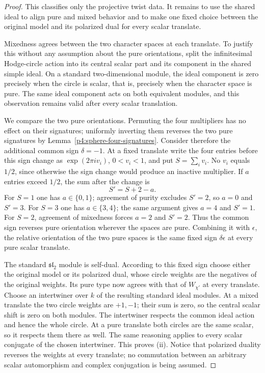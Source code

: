 \documentclass[11pt]{article}
\theoremstyle{plain}
\theoremstyle{definition}
\theoremstyle{remark}
\numberwithin{equation}{section}
\begin{document}
\begin{proof}
This classifies only the projective twist data.  It remains to use the
shared ideal to align pure and mixed behavior and to make one fixed choice
between the original model and its polarized dual for every scalar translate.

Mixedness agrees between the two character spaces at each
translate.  To justify this without any assumption about the
pure orientations, split the infinitesimal Hodge-circle action
into its central scalar part and its component in the shared
simple ideal.  On a standard two-dimensional module, the
ideal component is zero precisely when the circle is scalar,
that is, precisely when the character space is pure.  The
same ideal component acts on both equivalent modules, and
this observation remains valid after every scalar translation.

We compare the two pure orientations.  Permuting the four
multipliers has no effect on their signatures; uniformly
inverting them reverses the two pure signatures by
Lemma~\ref{p4:sphere-four-signatures}.  Consider therefore
the additional common sign $\delta=-1$.  At a fixed translate
write the four entries before this sign change as
$\exp(2\pi i v_i)$, $0<v_i<1$, and put
$S=\sum_i v_i$.  No $v_i$ equals $1/2$, since otherwise
the sign change would produce an inactive multiplier.  If
$a$ entries exceed $1/2$, the sum after the change is
\begin{equation}\label{p4:sphere-sign-change}
 S'=S+2-a.
\end{equation}
For $S=1$ one has $a\in\{0,1\}$; agreement of purity
excludes $S'=2$, so $a=0$ and $S'=3$.
For $S=3$ one has $a\in\{3,4\}$; the same argument gives
$a=4$ and $S'=1$.  For $S=2$, agreement of mixedness forces
$a=2$ and $S'=2$.  Thus the common sign reverses pure
orientation wherever the spaces are pure.  Combining it
with $\epsilon$, the relative orientation of the two pure
spaces is the same fixed sign $\delta\epsilon$ at every
pure scalar translate.

The standard $\mathfrak{sl}_2$ module is self-dual.  According
to this fixed sign choose either the original model or its
polarized dual, whose circle weights are the negatives of
the original weights.  Its pure type now agrees with that
of $W_{\chi'}$ at every translate.  Choose an intertwiner
over $k$ of the resulting standard ideal modules.  At a
mixed translate the two circle weights are $+1,-1$; their
sum is zero, so the central scalar shift is zero on both
modules.  The intertwiner respects the common ideal action
and hence the whole circle.  At a pure translate both
circles are the same scalar, so it respects them there as
well.  The same reasoning applies to every scalar conjugate
of the chosen intertwiner.  This proves (ii).  Notice that
polarized duality reverses the weights at every translate;
no commutation between an arbitrary scalar automorphism and
complex conjugation is being assumed.
\end{proof}
\end{document}
